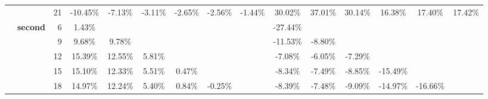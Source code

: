 \begin{table}[t]
{\begin{tabular}{ccrcccccccccccc}
          & \textcolor[rgb]{ .502,  .502,  .502}{} & 21    & \cellcolor[rgb]{ .98,  .769,  .776}-10.45\% & \cellcolor[rgb]{ .98,  .835,  .847}-7.13\% & \cellcolor[rgb]{ .984,  .922,  .933}-3.11\% & \cellcolor[rgb]{ .984,  .929,  .941}-2.65\% & \cellcolor[rgb]{ .984,  .933,  .945}-2.56\% & \cellcolor[rgb]{ .984,  .957,  .969}-1.44\% & \cellcolor[rgb]{ .655,  .757,  .886}30.02\% & \cellcolor[rgb]{ .58,  .702,  .859}37.01\% & \cellcolor[rgb]{ .655,  .753,  .882}30.14\% & \cellcolor[rgb]{ .808,  .863,  .937}16.38\% & \cellcolor[rgb]{ .796,  .855,  .933}17.40\% & \cellcolor[rgb]{ .796,  .855,  .933}17.42\% \\
    \cmidrule(r){2-3}
          & \multicolumn{1}{l}{\textcolor[rgb]{ .502,  .502,  .502}{\textbf{second}}} & 6     & \cellcolor[rgb]{ .973,  .98,  .996}1.43\% &       &       &       &       &       & \cellcolor[rgb]{ .973,  .412,  .42}-27.44\% &       &       &       &       &  \\
          & \textcolor[rgb]{ .502,  .502,  .502}{} & 9     & \cellcolor[rgb]{ .882,  .914,  .965}9.68\% & \cellcolor[rgb]{ .882,  .914,  .965}9.78\% &       &       &       &       & \cellcolor[rgb]{ .98,  .745,  .753}-11.53\% & \cellcolor[rgb]{ .98,  .8,  .812}-8.80\% &       &       &       &  \\
          & \textcolor[rgb]{ .502,  .502,  .502}{} & 12    & \cellcolor[rgb]{ .82,  .871,  .941}15.39\% & \cellcolor[rgb]{ .851,  .89,  .953}12.55\% & \cellcolor[rgb]{ .925,  .945,  .98}5.81\% &       &       &       & \cellcolor[rgb]{ .98,  .839,  .847}-7.08\% & \cellcolor[rgb]{ .984,  .859,  .871}-6.05\% & \cellcolor[rgb]{ .98,  .831,  .843}-7.29\% &       &       &  \\
          & \textcolor[rgb]{ .502,  .502,  .502}{} & 15    & \cellcolor[rgb]{ .824,  .871,  .941}15.10\% & \cellcolor[rgb]{ .855,  .894,  .953}12.33\% & \cellcolor[rgb]{ .929,  .949,  .98}5.51\% & \cellcolor[rgb]{ .984,  .988,  1}0.47\% &       &       & \cellcolor[rgb]{ .98,  .812,  .824}-8.34\% & \cellcolor[rgb]{ .98,  .827,  .839}-7.49\% & \cellcolor[rgb]{ .98,  .8,  .812}-8.85\% & \cellcolor[rgb]{ .976,  .663,  .671}-15.49\% &       &  \\
          & \textcolor[rgb]{ .502,  .502,  .502}{} & 18    & \cellcolor[rgb]{ .824,  .875,  .945}14.97\% & \cellcolor[rgb]{ .855,  .894,  .953}12.24\% & \cellcolor[rgb]{ .929,  .949,  .98}5.40\% & \cellcolor[rgb]{ .98,  .984,  1}0.84\% & \cellcolor[rgb]{ .984,  .98,  .992}-0.25\% &       & \cellcolor[rgb]{ .98,  .812,  .82}-8.39\% & \cellcolor[rgb]{ .98,  .827,  .839}-7.48\% & \cellcolor[rgb]{ .98,  .796,  .804}-9.09\% & \cellcolor[rgb]{ .976,  .671,  .682}-14.97\% & \cellcolor[rgb]{ .976,  .635,  .647}-16.66\% &  \\

\end{tabular}}
\end{table}
